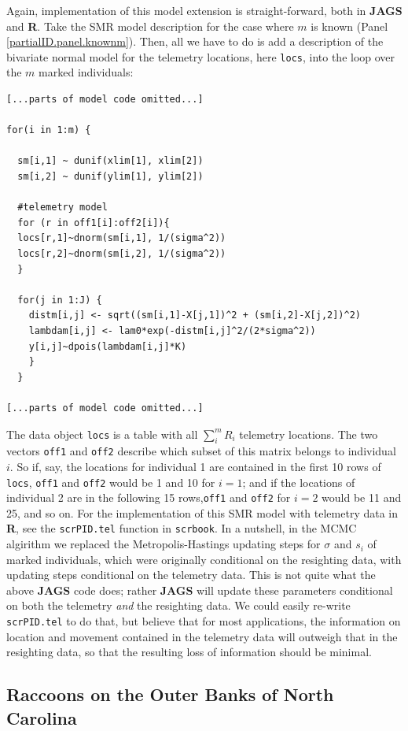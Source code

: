 Again, implementation of this model extension is straight-forward, both in {\bf JAGS} and {\bf R}. Take the SMR model description for the case where $m$ is known (Panel \ref{partialID.panel.knownm}). Then, all we have to do is add a description of the bivariate normal model for the telemetry locations, here {\tt locs}, into the loop over the $m$ marked individuals:
{\small
\begin{verbatim}
[...parts of model code omitted...]

for(i in 1:m) {

  sm[i,1] ~ dunif(xlim[1], xlim[2])
  sm[i,2] ~ dunif(ylim[1], ylim[2])

  #telemetry model
  for (r in off1[i]:off2[i]){
  locs[r,1]~dnorm(sm[i,1], 1/(sigma^2))
  locs[r,2]~dnorm(sm[i,2], 1/(sigma^2))
  }

  for(j in 1:J) {
    distm[i,j] <- sqrt((sm[i,1]-X[j,1])^2 + (sm[i,2]-X[j,2])^2)
    lambdam[i,j] <- lam0*exp(-distm[i,j]^2/(2*sigma^2))
    y[i,j]~dpois(lambdam[i,j]*K)
    }
  }

[...parts of model code omitted...]
\end{verbatim}
}
The data object {\tt locs} is a table with all $\sum_i^m R_i$ telemetry locations. The two vectors {\tt off1} and {\tt off2} describe which subset of this matrix belongs to individual $i$. So if, say, the locations for individual 1 are contained in the first 10 rows of {\tt locs}, {\tt off1} and {\tt off2} would be 1 and 10 for $i=1$; and if the locations of individual 2 are in the following 15 rows,{\tt off1} and {\tt off2} for $i=2$ would be 11 and 25, and so on. For the implementation of this SMR model with telemetry data in {\bf R}, see the {\tt scrPID.tel} function in {\tt scrbook}. In a nutshell, in the MCMC algirithm we replaced the Metropolis-Hastings updating steps for $\sigma$ and $s_i$ of marked individuals, which were originally conditional on the resighting data, with updating steps conditional on the telemetry data. This is not quite what the above {\bf JAGS} code does; rather {\bf JAGS} will update these parameters conditional on both the telemetry \emph{and} the resighting data. We could easily re-write {\tt scrPID.tel} to do that, but believe that for most applications, the information on location and movement contained in the telemetry data will outweigh that in the resighting data, so that the resulting loss of information should be minimal.

\subsection{Raccoons on the Outer Banks of North Carolina}

